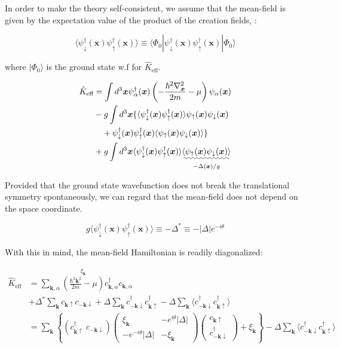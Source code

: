 In order to make the theory self-consistent, we assume that the mean-field is given by the expectation value of the product of the creation fields, :

\[\langle\psi_{\downarrow}^\dagger(\bm{x})\psi_\uparrow^\dagger(\bm{x})\rangle \equiv \langle\Phi_0|\psi_\downarrow^\dagger(\bm{x})\psi_\uparrow^\dagger(\bm{x})|\Phi_0\rangle \]

where $|\Phi_0\rangle$ is the ground state w.f for $\hat{K}_{\text{eff}}$. 

\[
\begin{split}
\hat{K}_{\text{eff}}&=\int d^3\bm{x}\psi_\alpha^\dagger(\bm{x})\left(-\frac{\hbar^2\nabla_{\bm{x}}^2}{2m}-\mu\right)\psi_\alpha(\bm{x})\\
&-g\int d^3\bm{x}\{\langle\psi_\downarrow^\dagger(\bm{x})\psi_\uparrow^\dagger(\bm{x})\rangle \psi_\uparrow(\bm{x})\psi_\downarrow(\bm{x})\\
&\quad+\psi_\downarrow^\dagger(\bm{x})\psi_\uparrow^\dagger(\bm{x}) \langle\psi_\uparrow(\bm{x})\psi_\downarrow(\bm{x})\rangle\}\\
&+g\int d^3\bm{x}\langle\psi_\downarrow^\dagger(\bm{x})\psi_\uparrow^\dagger(\bm{x})\rangle \underset{-\Delta(\bm{x})/g}{\uwave{\langle\psi_\uparrow(\bm{x})\psi_\downarrow(\bm{x})\rangle}}
\end{split}
 \]

Provided that the ground state wavefunction does not break the translational symmetry spontaneously, we can regard that the mean-field does not depend on the space coordinate. 

\[g\langle\psi_\downarrow^\dagger(\bm{x})\psi_\uparrow^\dagger(\bm{x})\rangle \equiv-\Delta^*\equiv-|\Delta|e^{-i\theta} \]

With this in mind, the mean-field Hamiltonian is readily diagonalized:

\[\begin{split}
\hat{K}_{\text{eff}} &=\sum_{\bm{k}, \alpha}\overset{\xi_{\bm{k}}}{\left(\frac{\hbar^2\bm{k}^2}{2m}-\mu\right)}c_{\bm{k},\alpha}^\dagger c_{\bm{k},\alpha}\\
&+\Delta^* \sum_{\bm{k}} c_{\bm{k}\uparrow}c_{-\bm{k}\downarrow}+ \Delta\sum_{\bm{k}}c_{-\bm{k}\downarrow}^\dagger c_{\bm{k}\uparrow}^\dagger - \Delta\sum_{\bm{k}}\langle c_{-\bm{k}\downarrow}^\dagger c_{\bm{k}\uparrow}^\dagger\rangle\\
&=\sum_{\bm{k}}\left\{(c_{\bm{k}\uparrow}^\dagger\  c_{-\bm{k}\downarrow}) \left(\begin{matrix}
\xi_{\bm{k}} & -e^{i\theta}|\Delta|\\
-e^{-i\theta}|\Delta| & -\xi_{\bm{k}}
\end{matrix}\right)
\left(\begin{matrix}
c_{\bm{k}\uparrow}\\
c_{-\bm{k}\downarrow}^\dagger
\end{matrix}\right)+\xi_{\bm{k}}\right\}-\Delta\sum_{\bm{k}}\langle c_{-\bm{k}\downarrow}^\dagger c_{\bm{k}\uparrow}^\dagger\rangle
\end{split} \]


